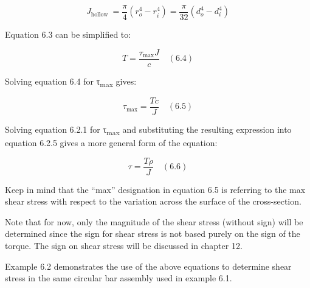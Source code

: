 \documentclass[
  letterpaper,
  DIV=11,
  numbers=noendperiod]{scrreprt}
\begin{document}
\[
J_{\text {hollow }}=\frac{\pi}{4}\left(r_o^4-r_i^4\right)=\frac{\pi}{32}\left(d_o^4-d_i^4\right)
\]

Equation 6.3 can be simplified to:

\[
T=\frac{\tau_{\max } J}{c}\quad(6.4)
\]

Solving equation 6.4 for τ\textsubscript{max} gives:

\[
\tau_{\max }=\frac{T c}{J} \quad(6.5)
\]

Solving equation 6.2.1 for τ\textsubscript{max} and substituting the
resulting expression into equation 6.2.5 gives a more general form of
the equation:

\[
\tau=\frac{T \rho}{J} \quad(6.6)
\]

Keep in mind that the ``max'' designation in equation 6.5 is referring
to the max shear stress with respect to the variation across the surface
of the cross-section.

Note that for now, only the magnitude of the shear stress (without sign)
will be determined since the sign for shear stress is not based purely
on the sign of the torque. The sign on shear stress will be discussed in
chapter 12.

Example 6.2 demonstrates the use of the above equations to determine
shear stress in the same circular bar assembly used in example 6.1.
\end{document}
